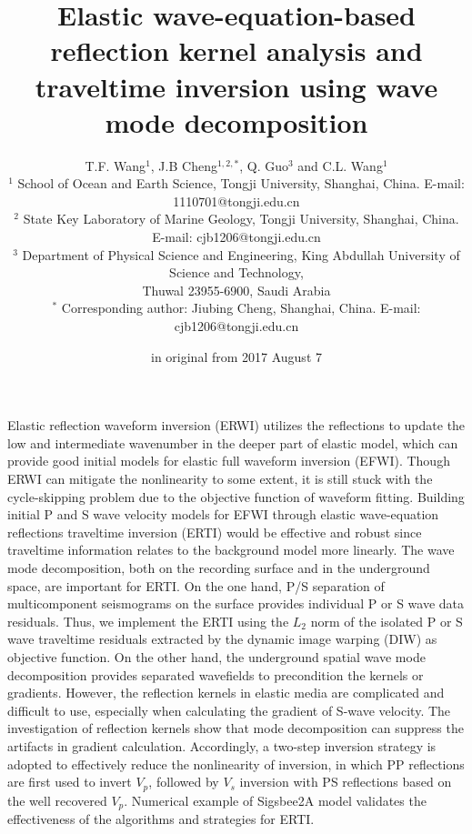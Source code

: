 \documentclass[extra,mreferee]{gji}
\begin{document}
\title[Elastic reflection kernel analysis and traveltime inversion]{Elastic wave-equation-based reflection kernel analysis and traveltime inversion using wave mode decomposition}
\author[Wang et al.]{
	T.F. Wang$^1$, J.B Cheng$^{1,2,*}$, Q. Guo$^3$ and C.L. Wang$^1$\\
    $^1$ School of Ocean and Earth Science, Tongji University, Shanghai,
    China. E-mail: 1110701@tongji.edu.cn\\
    $^2$ State Key Laboratory of Marine Geology, Tongji University,
    Shanghai, China. E-mail: cjb1206@tongji.edu.cn\\
    $^3$ 
	Department of Physical Science and Engineering, King Abdullah University of
	Science and Technology, \\Thuwal 23955-6900, Saudi Arabia\\
    $^*$ Corresponding author: Jiubing Cheng, Shanghai, China. E-mail: cjb1206@tongji.edu.cn\\
}
\date{in original from 2017 August 7}
\maketitle

\begin{summary}
Elastic reflection waveform inversion (ERWI) utilizes the reflections to update the low and
intermediate wavenumber in the deeper part of elastic model, which can provide good initial models
for elastic full waveform inversion (EFWI). Though ERWI can mitigate the nonlinearity to some
extent, it is still stuck with the cycle-skipping problem due to the objective function of waveform fitting. 
Building initial P and S wave velocity models for EFWI through elastic wave-equation
reflections traveltime inversion (ERTI) would be effective and robust
since traveltime information relates to the background model more linearly. 
The wave mode decomposition, both on the recording surface and in the underground space, are important for ERTI.
On the one hand,
P/S separation of multicomponent seismograms on the surface provides 
individual P or S wave data residuals.
Thus, we implement the ERTI using the $L_2$ norm of the isolated P or S wave traveltime
residuals extracted by the dynamic image warping (DIW) as objective function.
On the other hand, the underground spatial wave mode decomposition provides separated wavefields to precondition
the kernels or gradients.
However, the reflection kernels in elastic media are complicated and difficult to use, especially when
calculating the gradient of S-wave
velocity. The investigation of reflection kernels show that mode decomposition can suppress the artifacts in
gradient calculation.
Accordingly, a two-step inversion strategy is adopted to effectively reduce the nonlinearity of inversion, in which PP reflections are first used to invert $V_p$,
followed by $V_s$ inversion with PS reflections based on the well recovered $V_p$.
Numerical example of Sigsbee2A model validates the effectiveness of the
algorithms and strategies for ERTI.
\end{summary}
\end{document}
